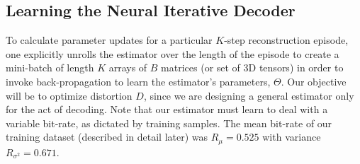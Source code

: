 \documentclass[smallabstract,smallcaptions]{dccpaper}
\begin{document}


\subsection{Learning the Neural Iterative Decoder}
\label{sec:learning}
To calculate parameter updates for a particular $K$-step reconstruction episode, one explicitly unrolls the estimator over the length of the episode to create a mini-batch of length $K$ arrays of $B$ matrices (or set of 3D tensors) in order to invoke back-propagation to learn the estimator's parameters, $\Theta$.
Our objective will be to optimize distortion $D$, since we are designing a general estimator only for the act of decoding. Note that our estimator must learn to deal with a variable bit-rate, as dictated by training samples.
The mean bit-rate of our training dataset (described in detail later) was $R_\mu = 0.525$ with variance $R_{\sigma^2} = 0.671$. %
\end{document}
